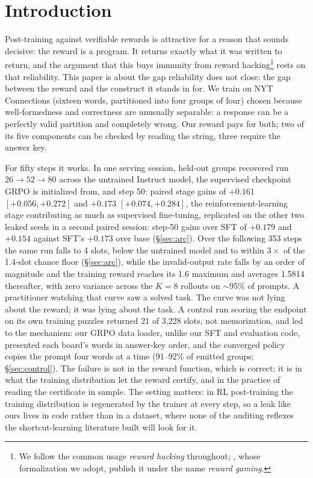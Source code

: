 \documentclass{article}
\begin{document}
\section{Introduction}
\label{sec:intro}

Post-training against verifiable rewards is attractive for a reason that
sounds decisive: the reward is a program. It returns exactly what it was
written to return, and the argument that this
buys immunity from reward hacking\footnote{We follow the common usage
\emph{reward hacking} throughout; \citet{skalse2022}, whose formalization we
adopt, publish it under the name \emph{reward gaming}.} rests on that
reliability. This paper is about the gap reliability does not close: the gap
between the reward and the construct it stands in for. We train on NYT
Connections (sixteen words, partitioned into four groups of four)
chosen because well-formedness and correctness are unusually separable: a
response can be a perfectly valid partition and completely wrong. Our
reward pays for both; two of its five components can be checked by reading
the string, three require the answer key.

For fifty steps it works. In one serving session, held-out groups
recovered run $26 \rightarrow 52 \rightarrow 80$ across the untrained
Instruct model, the supervised checkpoint GRPO is initialized from, and
step 50: paired stage gains of $+0.161$ $[+0.056, +0.272]$ and $+0.173$
$[+0.074, +0.284]$, the reinforcement-learning stage contributing as much
as supervised fine-tuning, replicated on the other two leaked seeds in a second paired session: step-50 gains over SFT of $+0.179$ and $+0.154$ against SFT's $+0.173$ over base (\S\ref{sec:arc}). Over the following
353 steps the same run falls to 4 slots, below the untrained model and to within $3\times$ of the 1.4-slot chance floor (\S\ref{sec:arc}), while
the invalid-output rate falls by an order of magnitude and the training
reward reaches its 1.6 maximum and averages 1.5814 thereafter, with
zero variance across the $K=8$ rollouts on $\sim$95\% of prompts. A
practitioner watching that curve saw a solved task. The curve was not lying
about the reward; it was lying about the task. A control run scoring the
endpoint on its own training puzzles returned 21 of 3{,}228 slots, not
memorization, and led to the mechanism: our GRPO data loader, unlike our
SFT and evaluation code, presented each board's words in answer-key order,
and the converged policy copies the prompt four words at a time
(91--92\% of emitted groups; \S\ref{sec:control}). The failure is not in the reward function, which is correct; it is in what the training distribution let the reward certify, and in the practice of reading the certificate in sample. The setting matters: in RL post-training the training distribution is regenerated by the trainer at every step, so a leak like ours lives in code rather than in a dataset, where none of the auditing reflexes the shortcut-learning literature built will look for it.
\end{document}

